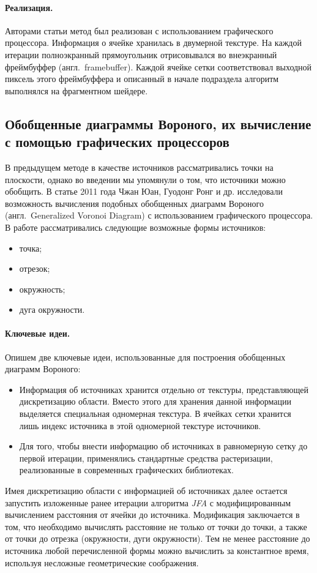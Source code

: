 \documentclass[12pt]{article}
\begin{document}
\paragraph{Реализация.} Авторами статьи метод был реализован с использованием 
графического процессора. Информация о ячейке хранилась в двумерной текстуре. 
На каждой итерации полноэкранный прямоугольник отрисовывался во внеэкранный
фреймбуффер (англ.~framebuffer). Каждой ячейке сетки соответствовал выходной
пиксель этого фреймбуффера и описанный в начале подраздела алгоритм
выполнялся на фрагментном шейдере.

\subsection{Обобщенные диаграммы Вороного, их вычисление с помощью графических 
процессоров}
\label{gvd}
В предыдущем методе в качестве источников рассматривались точки на плоскости, 
однако во введении мы упомянули о том, что источники можно обобщить. В статье 
2011 года \cite{gvd} Чжан Юан, Гуодонг Ронг и др. исследовали возможность
вычисления подобных обобщенных диаграмм Вороного (англ.~Generalized Voronoi
Diagram) с использованием графического  процессора. В работе рассматривались 
следующие возможные формы источников:

\begin{itemize}
\item точка;
\item отрезок;
\item окружность;
\item дуга окружности.
\end{itemize}

\paragraph{Ключевые идеи.} Опишем две ключевые идеи, использованные для
построения обобщенных диаграмм Вороного:
\begin{itemize}
\item Информация об источниках хранится отдельно от текстуры, представляющей
дискретизацию области. Вместо этого для хранения данной информации выделяется 
специальная одномерная текстура. В ячейках сетки хранится лишь индекс 
источника в этой одномерной текстуре источников.
\item Для того, чтобы внести информацию об источниках в равномерную сетку 
до первой итерации, применялись стандартные средства растеризации, реализованные 
в современных графических библиотеках.
\end{itemize}
Имея дискретизацию области с информацией об источниках далее остается
запустить изложенные ранее итерации алгоритма \emph{JFA} с модифицированным 
вычислением расстояния от ячейки до источника. Модификация заключается в том, что
необходимо вычислять расстояние не только от точки до точки, а также от точки до отрезка 
(окружности, дуги окружности). Тем не менее расстояние до источника любой
перечисленной формы можно вычислить за константное время, 
используя несложные геометрические соображения.
\end{document}
